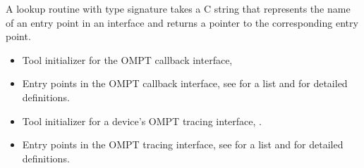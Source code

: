 \constraints
A lookup routine with type
signature  takes a C string
that represents the name of an entry point in an interface
and returns a pointer to the corresponding entry point.

\crossreferences
\begin{itemize}
\item Tool initializer for the OMPT callback interface, 
\item Entry points in the OMPT callback interface, see
   for a list and
   for detailed definitions.
\item Tool initializer for a device's OMPT tracing interface, .
\item Entry points in the OMPT tracing interface, see
   for a list and
   for detailed definitions.
\end{itemize}
